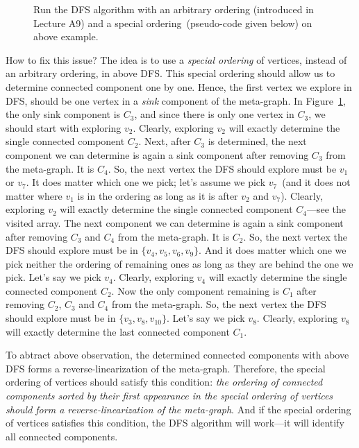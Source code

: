 \begin{figure}[h!]
\centering{}
\caption{Run the DFS algorithm with an arbitrary ordering (introduced in Lecture A9) and a special ordering~(pseudo-code given below) on above example.}
\label{fig:dfs-meta}
\end{figure}

How to fix this issue? The idea is to use a \emph{special ordering} of vertices, instead of an arbitrary ordering, in above DFS.
This special ordering should allow us to determine connected component one by one. Hence, the first vertex we explore in DFS,
should be one vertex in a \emph{sink} component of the meta-graph. In Figure~\ref{fig:dfs-meta}, the only sink component is $C_3$,
and since there is only one vertex in $C_3$, we should start with exploring $v_2$.
Clearly, exploring $v_2$ will exactly determine the single connected component $C_2$.
Next, after $C_3$ is determined, the next component we can determine is again a sink component after removing $C_3$ from the meta-graph.
It is $C_4$. So, the next vertex the DFS should explore must be $v_1$ or $v_7$. It does matter which one we pick; let's assume we pick $v_7$~(and it
does not matter where $v_1$ is in the ordering as long as it is after $v_2$ and $v_7$).
Clearly, exploring $v_2$ will exactly determine the single connected component $C_4$---see the visited array.
The next component we can determine is again a sink component after removing $C_3$ and $C_4$ from the meta-graph.
It is $C_2$. So, the next vertex the DFS should explore must be in $\{v_4, v_5,v_6,v_9\}$. 
And it does matter which one we pick neither the ordering of remaining ones as long as they are behind the one we pick.
Let's say we pick $v_4$. Clearly, exploring $v_4$ will exactly determine the single connected component $C_2$.
Now the only component remaining is $C_1$ after removing $C_2$, $C_3$ and $C_4$ from the meta-graph.
So, the next vertex the DFS should explore must be in $\{v_3, v_8, v_{10}\}$. 
Let's say we pick $v_8$. Clearly, exploring $v_8$ will exactly determine the last connected component $C_1$.


To abtract above observation, the determined connected components with above DFS
forms a reverse-linearization of the meta-graph.
Therefore, the special ordering of vertices should satisfy this condition:
\emph{the ordering of connected components sorted by their first appearance in the special ordering of vertices
should form a reverse-linearization of the meta-graph}.
And if the special ordering of vertices satisfies this condition, the DFS algorithm will work---it will identify
all connected components.

